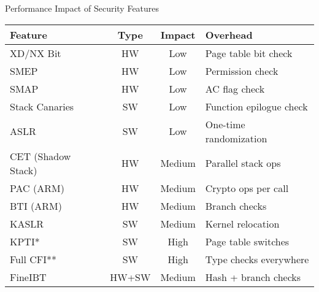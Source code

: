 \documentclass[aspectratio=169,12pt]{beamer}
\begin{document}
\begin{frame}{Performance Impact of Security Features}
    \begin{center}
        \begin{tabular}{|l|c|c|l|}
            \hline
            \textbf{Feature} & \textbf{Type} & \textbf{Impact} & \textbf{Overhead} \\
            \hline
            \hline
            XD/NX Bit & HW & \cellcolor{green!30}Low & Page table bit check \\
            \hline
            SMEP & HW & \cellcolor{green!30}Low & Permission check \\
            \hline
            SMAP & HW & \cellcolor{green!30}Low & AC flag check \\
            \hline
            Stack Canaries & SW & \cellcolor{green!30}Low & Function epilogue check \\
            \hline
            ASLR & SW & \cellcolor{green!30}Low & One-time randomization \\
            \hline
            CET (Shadow Stack) & HW & \cellcolor{yellow!30}Medium & Parallel stack ops \\
            \hline
            PAC (ARM) & HW & \cellcolor{yellow!30}Medium & Crypto ops per call \\
            \hline
            BTI (ARM) & HW & \cellcolor{yellow!30}Medium & Branch checks \\
            \hline
            KASLR & SW & \cellcolor{yellow!30}Medium & Kernel relocation \\
            \hline
            KPTI* & SW & \cellcolor{orange!30}High & Page table switches \\
            \hline
            Full CFI** & SW & \cellcolor{orange!30}High & Type checks everywhere \\
            \hline
            FineIBT & HW+SW & \cellcolor{yellow!30}Medium & Hash + branch checks \\
            \hline
        \end{tabular}
    \end{center}
    

\end{frame}
\end{document}
